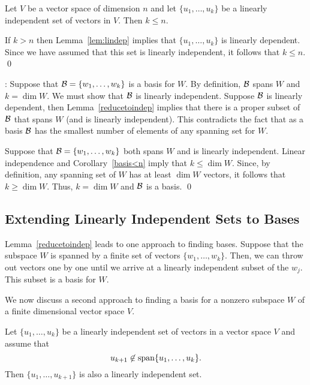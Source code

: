 \documentclass{ximera}
\begin{document}
\begin{cor}  \label{basis<n}
Let $V$ be a vector space of dimension $n$ and let $\{u_1,\ldots,u_k\}$ be a 
linearly independent set of vectors in $V$.  Then $k\le n$.
\end{cor} 

\proof If $k>n$ then Lemma~\ref{lem:lindep} implies that
$\{u_1,\ldots,u_k\}$ is linearly dependent.  Since we have
assumed that this set is linearly independent, it follows that
$k\leq n$. \qed

\vspace{0.1in}

:
Suppose that ${\cal B}=\{w_1,\ldots,w_k\}$ is a basis for $W$.
By definition, ${\cal B}$ spans $W$ and $k=\dim W$.  We must
show that ${\cal B}$ is linearly independent.  Suppose ${\cal B}$
is linearly dependent, then Lemma~\ref{reducetoindep} implies
that there is a proper subset of ${\cal B}$ that spans $W$ (and
is linearly independent). This contradicts the fact that as a
basis ${\cal B}$ has the smallest number of elements of any
spanning set for $W$.

Suppose that ${\cal B}=\{w_1,\ldots,w_k\}$ both spans $W$ and is
linearly independent.  Linear independence and Corollary~\ref{basis<n}
imply that $k\leq\dim W$.  Since, by definition, any spanning set
of $W$ has at least $\dim W$ vectors, it follows that $k\geq\dim W$.
Thus, $k = \dim W$ and  ${\cal B}$ is a basis.   \qed

\subsection*{Extending Linearly Independent Sets to Bases} 

Lemma~\ref{reducetoindep} leads to one approach to finding
bases.  Suppose that the subspace $W$ is spanned by a finite
set of vectors $\{w_1,\ldots,w_k\}$.  Then, we can throw out
vectors one by one until we arrive at a linearly independent
subset of the $w_j$.  This subset is a basis for $W$.

We now discuss a second approach to finding a basis for a
nonzero subspace $W$ of a finite dimensional vector space $V$.

\begin{lemma}  \label{extendindep}
Let $\{u_1,\ldots,u_k\}$ be a linearly independent set of
vectors in a vector space $V$ and assume that
\[
u_{k+1}\not\in{\rm span}\{u_1,\ldots,u_k\}.
\]
Then $\{u_1,\ldots,u_{k+1}\}$ is also a linearly independent
set.
\end{lemma} 
\end{document}
